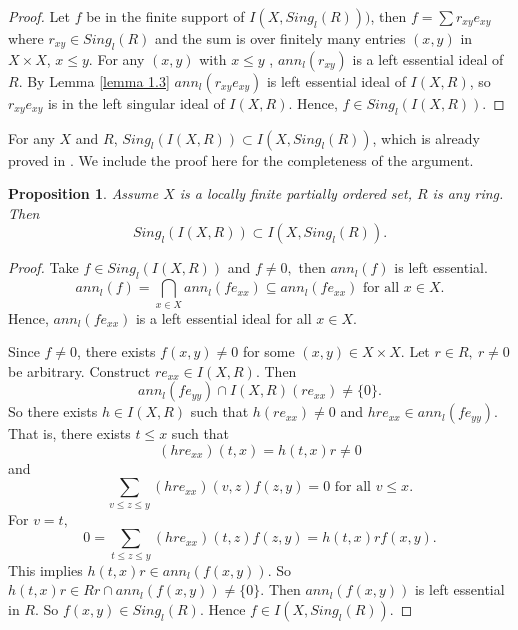 \documentclass[12pt]{article}
\newtheorem{proposition}[theorem]{Proposition}
\begin{document}
\begin{proof}
Let $f$ be in the finite support of $I(X,Sing_l(R)))$, then $f = \sum
r_{xy}e_{xy}$ where $r_{xy} \in Sing_l(R)$ and the sum is over finitely many
entries $(x,y)$ in $X \times X$, $x \leq y$. For any $(x,y)$ with $x \leq y$%
, $ann_l(r_{xy})$ is a left essential ideal of $R$. By Lemma \ref{lemma 1.3} 
$ann_l(r_{xy}e_{xy})$ is left essential ideal of ${I(X,R)}$, so $%
r_{xy}e_{xy} $ is in the left singular ideal of ${I(X,R)}$. Hence, $f \in
Sing_l({I(X,R)})$.
\end{proof}

\medskip

For any $X$ and $R$, $Sing_l({I(X,R)}) \subset I(X,Sing_l(R)) $, which is
already proved in \cite[Thm 12, Prop 13]{Trio:CharIncAlg}. We include the
proof here for the completeness of the argument.

\begin{proposition}
\label{Singularideal} Assume $X$ is a locally finite partially ordered set, $%
R$ is any ring. Then 
\begin{equation*}
Sing_l({I(X,R)}) \subset I(X,Sing_l(R)) .
\end{equation*}
\end{proposition}

\begin{proof}
Take $f\in Sing_l({I(X,R)})$ and $f\neq 0,$ then $ann_l(f)$ is left
essential. 
\begin{equation*}
ann_l(f)=\bigcap_{x\in X}ann_l(fe_{xx})\subseteq ann_l(fe_{xx}) \text{ for
all } x\in X.
\end{equation*}
Hence, $ann_l(fe_{xx})$ is a left essential ideal for all $x\in X.$

Since $f\neq 0$, there exists $f(x,y)\neq 0$ for some $(x,y)\in X\times X.$
Let $r \in R,~r \neq 0$ be arbitrary. Construct $r e_{xx}\in I(X,R)$. Then 
\begin{equation*}
ann_l(fe_{yy})\cap I(X,R)(r e_{xx})\neq \{0\}.
\end{equation*}
So there exists $h\in I(X,R)$ such that $h(r e_{xx})\neq 0$ and $hre_{xx}\in
ann_l(fe_{yy}).$ That is, there exists $t\leq x$ such that 
\begin{equation*}
(hre_{xx})(t,x)= h(t,x)r\neq 0
\end{equation*}
and 
\begin{equation*}
\sum_{v\leq z\leq y}(hre_{xx})(v,z)f(z,y)=0 \text{ for all } v\leq x.
\end{equation*}
For $v=t,$ 
\begin{equation*}
0=\sum_{t\leq z\leq y}(hre_{xx})(t,z)f(z,y)=h(t,x)rf(x,y).
\end{equation*}
This implies $h(t,x)r\in ann_l(f(x,y)).$ So $h(t,x)r\in Rr\cap
ann_l(f(x,y))\neq \{0\}.$ Then $ann_l(f(x,y))$ is left essential in $R$. So $%
f(x,y)\in Sing_l(R).$ Hence $f\in I(X,Sing_l(R)).$
\end{proof}
\end{document}
